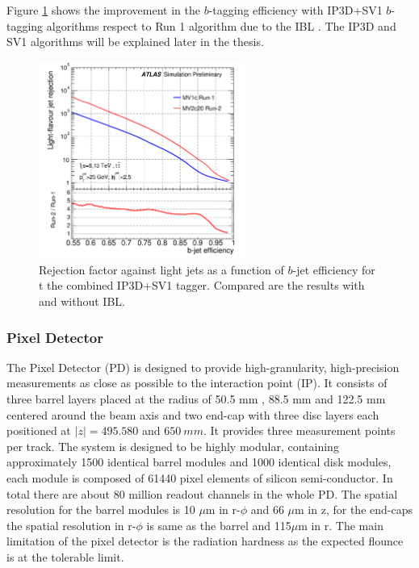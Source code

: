 Figure \ref{fig:chap2:ATLAS:ITK:IBL:Btag} shows the improvement in the $b$-tagging efficiency with IP3D+SV1 $b$-tagging algorithms respect to Run 1 algorithm due to the IBL \cite{IBL_Btag, IBL_Btag2}. The IP3D and SV1 algorithms will be explained later in the thesis.
\begin{figure}[H]
    \centering
    \includegraphics[width=0.6\textwidth]{Ch2/Img/IBL_btag2.png}
    \caption{Rejection factor against light jets as a function of $b$-jet efficiency for t the combined IP3D+SV1 tagger. Compared are the results with and without IBL.}
    \label{fig:chap2:ATLAS:ITK:IBL:Btag}
\end{figure}
\subsubsection{Pixel Detector}
\label{chap2:ATLAS:ITK:PD}
The Pixel Detector (PD) is designed to provide high-granularity, high-precision measurements as close as possible to the interaction point (IP). It consists of three barrel layers placed at the radius of 50.5 mm , 88.5 mm and 122.5 mm centered around the beam axis and two end-cap with three disc layers each positioned at $|z|= 495.580$ and $650 \ mm$. It provides three measurement points per track. The system is designed to be highly modular, containing approximately 1500 identical barrel modules and 1000 identical disk modules, each module is composed of 61440 pixel elements of silicon semi-conductor. In total there are about 80 million readout channels in the whole PD. The spatial resolution for the barrel modules is 10 $\mu$m in r-$\phi$ and 66 $\mu$m in z, for the end-caps the spatial resolution in r-$\phi$ is same as the barrel and 115$\mu$m in r. The main limitation of the pixel detector is the radiation hardness as the expected flounce is at the tolerable limit. 
